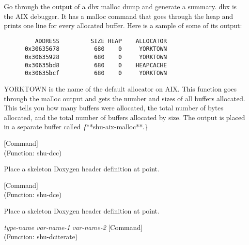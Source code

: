 \begin{doc-string}
Go through the output of a dbx malloc dump and generate a summary.  dbx is
the AIX debugger.  It has a malloc command that goes through the heap and prints
one line for every allocated buffer.  Here is a sample of some of its output:

\small{\begin{verbatim}
         ADDRESS         SIZE HEAP    ALLOCATOR
      0x30635678          680    0     YORKTOWN
      0x30635928          680    0     YORKTOWN
      0x30635bd8          680    0    HEAPCACHE
      0x30635bcf          680    0     YORKTOWN
\end{verbatim}}

YORKTOWN is the name of the default allocator on AIX.  This function goes
through the malloc output and gets the number and sizes of all buffers
allocated.  This tells you how many buffers were allocated, the total number of
bytes allocated, and the total number of buffers allocated by size.  The output
is placed in a separate buffer called \emph\{**shu-aix-malloc**.\}
\end{doc-string}

\vspace{1em}
\noindent
{}
\usebox{\funcname}
 \hfill [Command]\\%
 (Function: shu-dcc)

\begin{doc-string}
Place a skeleton Doxygen header definition at point.
\end{doc-string}

\vspace{1em}
\noindent
{}
\usebox{\funcname}
 \hfill [Command]\\%
 (Function: shu-dce)

\begin{doc-string}
Place a skeleton Doxygen header definition at point.
\end{doc-string}

\vspace{1em}
\noindent
{}
\usebox{\funcname}\emph{type-name} \emph{var-name-1} \emph{var-name-2}
 \hfill [Command]\\%
 (Function: shu-dciterate)

